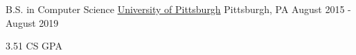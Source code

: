 
\vspace{-7mm}


\vspace{-1mm}
\begin{cventries}

  \cventry
    {B.S. in Computer Science} %
    {\href{https://www.pitt.edu/}{University of Pittsburgh}} %
    {Pittsburgh, PA} %
    {August 2015 - August 2019} %
    {
      \begin{cvitems} %
        \item {3.51 CS GPA}
      \end{cvitems}
    }
    
  \vspace{-6mm}
  
\end{cventries}
